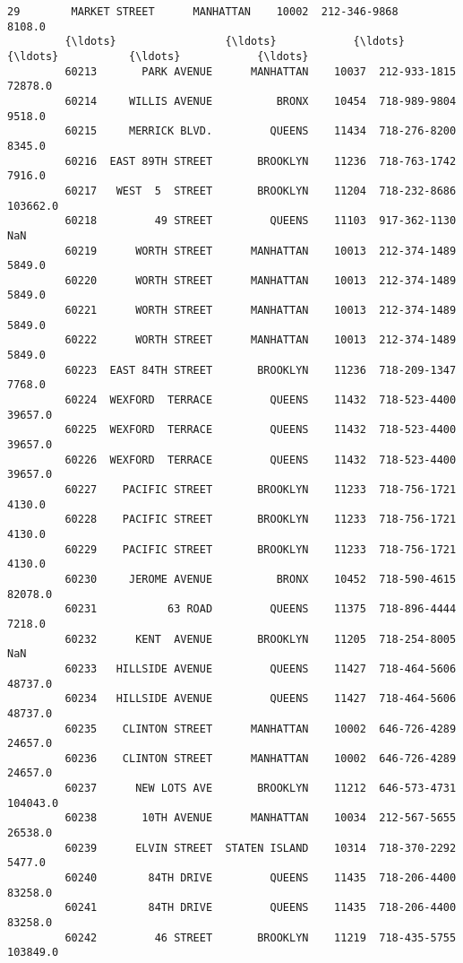 \documentclass[11pt]{article}
\begin{document}
\begin{Verbatim}[commandchars=\\\{\}]
         29        MARKET STREET      MANHATTAN    10002  212-346-9868         8108.0   
         {\ldots}                 {\ldots}            {\ldots}      {\ldots}           {\ldots}            {\ldots}   
         60213       PARK AVENUE      MANHATTAN    10037  212-933-1815        72878.0   
         60214     WILLIS AVENUE          BRONX    10454  718-989-9804         9518.0   
         60215     MERRICK BLVD.         QUEENS    11434  718-276-8200         8345.0   
         60216  EAST 89TH STREET       BROOKLYN    11236  718-763-1742         7916.0   
         60217   WEST  5  STREET       BROOKLYN    11204  718-232-8686       103662.0   
         60218         49 STREET         QUEENS    11103  917-362-1130            NaN   
         60219      WORTH STREET      MANHATTAN    10013  212-374-1489         5849.0   
         60220      WORTH STREET      MANHATTAN    10013  212-374-1489         5849.0   
         60221      WORTH STREET      MANHATTAN    10013  212-374-1489         5849.0   
         60222      WORTH STREET      MANHATTAN    10013  212-374-1489         5849.0   
         60223  EAST 84TH STREET       BROOKLYN    11236  718-209-1347         7768.0   
         60224  WEXFORD  TERRACE         QUEENS    11432  718-523-4400        39657.0   
         60225  WEXFORD  TERRACE         QUEENS    11432  718-523-4400        39657.0   
         60226  WEXFORD  TERRACE         QUEENS    11432  718-523-4400        39657.0   
         60227    PACIFIC STREET       BROOKLYN    11233  718-756-1721         4130.0   
         60228    PACIFIC STREET       BROOKLYN    11233  718-756-1721         4130.0   
         60229    PACIFIC STREET       BROOKLYN    11233  718-756-1721         4130.0   
         60230     JEROME AVENUE          BRONX    10452  718-590-4615        82078.0   
         60231           63 ROAD         QUEENS    11375  718-896-4444         7218.0   
         60232      KENT  AVENUE       BROOKLYN    11205  718-254-8005            NaN   
         60233   HILLSIDE AVENUE         QUEENS    11427  718-464-5606        48737.0   
         60234   HILLSIDE AVENUE         QUEENS    11427  718-464-5606        48737.0   
         60235    CLINTON STREET      MANHATTAN    10002  646-726-4289        24657.0   
         60236    CLINTON STREET      MANHATTAN    10002  646-726-4289        24657.0   
         60237      NEW LOTS AVE       BROOKLYN    11212  646-573-4731       104043.0   
         60238       10TH AVENUE      MANHATTAN    10034  212-567-5655        26538.0   
         60239      ELVIN STREET  STATEN ISLAND    10314  718-370-2292         5477.0   
         60240        84TH DRIVE         QUEENS    11435  718-206-4400        83258.0   
         60241        84TH DRIVE         QUEENS    11435  718-206-4400        83258.0   
         60242         46 STREET       BROOKLYN    11219  718-435-5755       103849.0   
         

\end{Verbatim}
\end{document}
